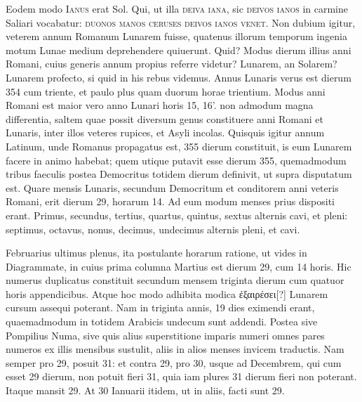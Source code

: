 Eodem
modo \textsc{Ianus} erat Sol.
%
Qui, ut illa \textsc{deiva iana}, sic \textsc{deivos
ianos} in carmine Saliari vocabatur: \textsc{duonos manos ceruses
deivos ianos venet}.
Non dubium igitur, veterem
annum Romanum Lunarem fuisse, quatenus illorum temporum ingenia
motum Lunae medium deprehendere quiuerunt.
Quid?
Modus
dierum illius anni Romani, cuius generis annum propius referre
videtur?
Lunarem, an Solarem?
Lunarem profecto, si quid in his
rebus videmus.
Annus Lunaris verus est dierum 354 cum triente,
et paulo plus quam duorum horae trientium.
Modus anni Romani
est maior vero anno Lunari horis 15, 16'. %
non admodum magna differentia,
saltem quae possit diversum genus constituere anni Romani
et Lunaris, inter illos veteres rupices, et Asyli incolas.
Quisquis igitur
annum Latinum, unde Romanus propagatus est, 355 dierum
constituit, is eum Lunarem facere in animo habebat; quem utique
putavit esse dierum 355, quemadmodum tribus faeculis postea Democritus
totidem dierum definivit, ut supra disputatum est.
Quare
mensis Lunaris, secundum Democritum et conditorem anni veteris
Romani, erit dierum 29, horarum 14.
Ad eum modum menses
prius dispositi erant.
Primus, secundus, tertius, quartus, quintus,
sextus alternis cavi, et pleni: septimus, octavus, nonus, decimus,
undecimus alternis pleni, et cavi.
\begin{table}[tb]
  
\end{table}
%
Februarius ultimus plenus,
ita postulante horarum
ratione, ut vides in
Diagrammate, in cuius
prima columna Martius
est dierum 29, cum 14 horis.
Hic numerus duplicatus
constituit secundum
mensem triginta dierum
cum quatuor horis
appendicibus.
Atque hoc
modo adhibita modica
\textgreek{ἐξαιρέσει[?]} Lunarem cursum
assequi poterant.
Nam in
triginta annis, 19 dies eximendi erant, quaemadmodum in totidem
Arabicis undecum sunt addendi.
Postea sive Pompilius
Numa, sive quis alius superstitione imparis numeri omnes pares
numeros ex illis mensibus sustulit, aliis in alios menses invicem
traductis.
Nam semper pro 29, posuit 31: et contra 29,
pro 30, usque ad Decembrem, qui cum esset 29 dierum, non
potuit fieri 31, quia iam plures 31 dierum fieri non poterant.
Itaque
mansit 29.
%
At 30 Ianuarii itidem, ut in aliis, facti sunt 29.
